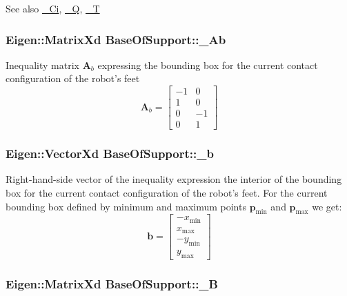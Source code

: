 \begin{DoxySeeAlso}{\-See also}
\hyperlink{classBaseOfSupport_a0a7a51d0d278841633e4b291df96065d}{\-\_\-\-Ci}, \hyperlink{classBaseOfSupport_a22efc7f81862ffd1268b862ddb9d59ff}{\-\_\-\-Q}, \hyperlink{classBaseOfSupport_a52f07f15e1667eb7876e614dcd817ef1}{\-\_\-\-T} 
\end{DoxySeeAlso}
\hypertarget{classBaseOfSupport_a42d531cd89c34cf8821c5cdeff321bc1}{
\subsubsection[{\-\_\-\-Ab}]{\setlength{\rightskip}{0pt plus 5cm}\-Eigen\-::\-Matrix\-Xd {\bf \-Base\-Of\-Support\-::\-\_\-\-Ab}}}\label{classBaseOfSupport_a42d531cd89c34cf8821c5cdeff321bc1}
\-Inequality matrix $\mathbf{A}_b$ expressing the bounding box for the current contact configuration of the robot's feet \[ \mathbf{A}_b = \left[\begin{array}{cc} -1 & 0\\ 1 & 0\\ 0 & -1\\ 0 & 1 \end{array}\right] \] \hypertarget{classBaseOfSupport_a9a77c3e98a73065f60b99e888c50fcc7}{
\subsubsection[{\-\_\-b}]{\setlength{\rightskip}{0pt plus 5cm}\-Eigen\-::\-Vector\-Xd {\bf \-Base\-Of\-Support\-::\-\_\-b}}}\label{classBaseOfSupport_a9a77c3e98a73065f60b99e888c50fcc7}
\-Right-\/hand-\/side vector of the inequality expression the interior of the bounding box for the current contact configuration of the robot's feet. \-For the current bounding box defined by minimum and maximum points $\mathbf{p}_{\text{min}}$ and $\mathbf{p}_{\text{max}}$ we get\-: \[ \mathbf{b} = \left[ \begin{array}{c} -x_{\text{min}}\\ x_{\text{max}}\\ -y_{\text{min}}\\ y_{\text{max}} \end{array} \right] \] \hypertarget{classBaseOfSupport_a8dd3c63ff193e5722c93307a952178a8}{
\subsubsection[{\-\_\-\-B}]{\setlength{\rightskip}{0pt plus 5cm}\-Eigen\-::\-Matrix\-Xd {\bf \-Base\-Of\-Support\-::\-\_\-\-B}}}\label{classBaseOfSupport_a8dd3c63ff193e5722c93307a952178a8}
